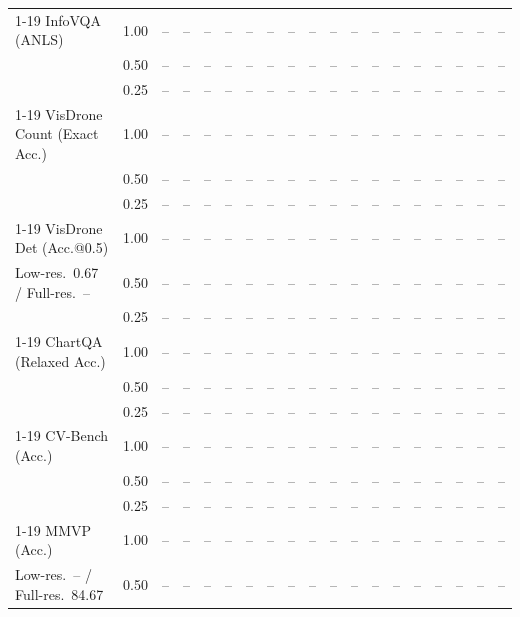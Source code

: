 \begin{table}[t]
{\begin{tabular}{l c | c c c c | c c c c | c c | c c c | c c c c}
\cmidrule(lr){1-19}
InfoVQA (ANLS) & 1.00 & -- & -- & -- & -- & -- & -- & -- & -- & -- & -- & -- & -- & -- & -- & -- & -- & -- \\
 & 0.50 & -- & -- & -- & -- & -- & -- & -- & -- & -- & -- & -- & -- & -- & -- & -- & -- & -- \\
 & 0.25 & -- & -- & -- & -- & -- & -- & -- & -- & -- & -- & -- & -- & -- & -- & -- & -- & -- \\
\cmidrule(lr){1-19}
VisDrone Count (Exact Acc.) & 1.00 & -- & -- & -- & -- & -- & -- & -- & -- & -- & -- & -- & -- & -- & -- & -- & -- & -- \\
 & 0.50 & -- & -- & -- & -- & -- & -- & -- & -- & -- & -- & -- & -- & -- & -- & -- & -- & -- \\
 & 0.25 & -- & -- & -- & -- & -- & -- & -- & -- & -- & -- & -- & -- & -- & -- & -- & -- & -- \\
\cmidrule(lr){1-19}
VisDrone Det (Acc.@0.5) & 1.00 & -- & -- & -- & -- & -- & -- & -- & -- & -- & -- & -- & -- & -- & -- & -- & -- & -- \\
{\footnotesize Low-res.\ 0.67 / Full-res.\ --} & 0.50 & -- & -- & -- & -- & -- & -- & -- & -- & -- & -- & -- & -- & -- & -- & -- & -- & -- \\
 & 0.25 & -- & -- & -- & -- & -- & -- & -- & -- & -- & -- & -- & -- & -- & -- & -- & -- & -- \\
\cmidrule(lr){1-19}
ChartQA (Relaxed Acc.) & 1.00 & -- & -- & -- & -- & -- & -- & -- & -- & -- & -- & -- & -- & -- & -- & -- & -- & -- \\
 & 0.50 & -- & -- & -- & -- & -- & -- & -- & -- & -- & -- & -- & -- & -- & -- & -- & -- & -- \\
 & 0.25 & -- & -- & -- & -- & -- & -- & -- & -- & -- & -- & -- & -- & -- & -- & -- & -- & -- \\
\cmidrule(lr){1-19}
CV-Bench (Acc.) & 1.00 & -- & -- & -- & -- & -- & -- & -- & -- & -- & -- & -- & -- & -- & -- & -- & -- & -- \\
 & 0.50 & -- & -- & -- & -- & -- & -- & -- & -- & -- & -- & -- & -- & -- & -- & -- & -- & -- \\
 & 0.25 & -- & -- & -- & -- & -- & -- & -- & -- & -- & -- & -- & -- & -- & -- & -- & -- & -- \\
\cmidrule(lr){1-19}
MMVP (Acc.) & 1.00 & -- & -- & -- & -- & -- & -- & -- & -- & -- & -- & -- & -- & -- & -- & -- & -- & -- \\
{\footnotesize Low-res.\ -- / Full-res.\ 84.67} & 0.50 & -- & -- & -- & -- & -- & -- & -- & -- & -- & -- & -- & -- & -- & -- & -- & -- & -- \\

\end{tabular}}
\end{table}
